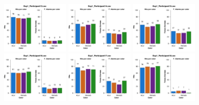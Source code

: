 \begin{figure}[th]
\includegraphics[width=0.30\textwidth]{Figures/Color_Exp1_P13} \includegraphics[width=0.30\textwidth]{Figures/Color_Exp1_P14} \includegraphics[width=0.30\textwidth]{Figures/Color_Exp1_P15}
\includegraphics[width=0.30\textwidth]{Figures/Color_Exp1_P16} \includegraphics[width=0.30\textwidth]{Figures/Color_Exp1_P17} \includegraphics[width=0.30\textwidth]{Figures/Color_Exp1_P18}

\end{figure}
